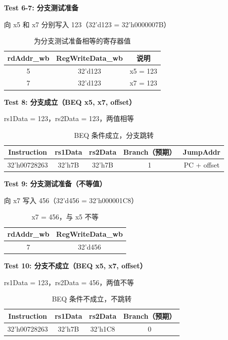 \documentclass[12pt,a4paper]{article}
\begin{document}
\textbf{Test 6-7: 分支测试准备}

向 x5 和 x7 分别写入 123（32'd123 = 32'h0000007B）

\begin{table}[H]
\centering
\begin{tabular}{|c|c|c|}
\hline
rdAddr\_wb & RegWriteData\_wb & 说明 \\ \hline
5 & 32'd123 & x5 = 123 \\ \hline
7 & 32'd123 & x7 = 123 \\ \hline
\end{tabular}
\caption{为分支测试准备相等的寄存器值}
\end{table}

\textbf{Test 8: 分支成立（BEQ x5, x7, offset）}

rs1Data = 123，rs2Data = 123，两值相等

\begin{table}[H]
\centering
\begin{tabular}{|c|c|c|c|c|}
\hline
Instruction & rs1Data & rs2Data & Branch（预期） & JumpAddr \\ \hline
32'h00728263 & 32'h7B & 32'h7B & 1 & PC + offset \\ \hline
\end{tabular}
\caption{BEQ 条件成立，分支跳转}
\end{table}

\textbf{Test 9: 分支测试准备（不等值）}

向 x7 写入 456（32'd456 = 32'h000001C8）

\begin{table}[H]
\centering
\begin{tabular}{|c|c|}
\hline
rdAddr\_wb & RegWriteData\_wb \\ \hline
7 & 32'd456 \\ \hline
\end{tabular}
\caption{x7 = 456，与 x5 不等}
\end{table}

\textbf{Test 10: 分支不成立（BEQ x5, x7, offset）}

rs1Data = 123，rs2Data = 456，两值不等

\begin{table}[H]
\centering
\begin{tabular}{|c|c|c|c|}
\hline
Instruction & rs1Data & rs2Data & Branch（预期） \\ \hline
32'h00728263 & 32'h7B & 32'h1C8 & 0 \\ \hline
\end{tabular}
\caption{BEQ 条件不成立，不跳转}
\end{table}
\end{document}
